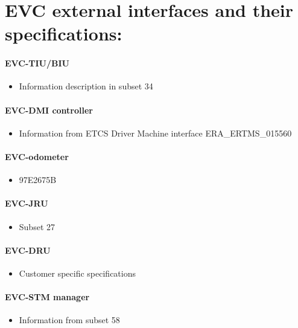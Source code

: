 \documentclass{template/openetcs_article}
\begin{document}
\section{EVC external interfaces and their specifications:}

\paragraph{EVC-TIU/BIU}
\begin{itemize}
\item Information description in subset 34
\end{itemize}

\paragraph{EVC-DMI controller}
\begin{itemize}
\item Information from ETCS Driver Machine interface ERA\_ERTMS\_015560
\end{itemize}
\paragraph{EVC-odometer}
\begin{itemize}
\item 97E2675B
\end{itemize}

\paragraph{EVC-JRU}
\begin{itemize}
\item Subset 27
\end{itemize}

\paragraph{EVC-DRU}
\begin{itemize}
\item Customer specific specifications
\end{itemize}

\paragraph{EVC-STM manager}
\begin{itemize}
\item Information from subset 58
\end{itemize}
\end{document}
